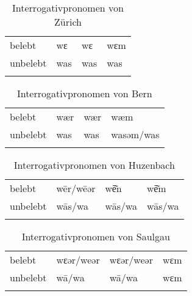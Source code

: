 
\begin{table}[H]
	\caption{Interrogativpronomen von Zürich \citep[144-145]{Weber1987}}\label{table70}
	\begin{tabular}{llll}
		\lsptoprule
		& \NOM & \AKK & \DAT\\\midrule
 belebt & wɛ & wɛ & wɛm\\
		unbelebt & was & was & was\\
		\lspbottomrule
	\end{tabular}
\end{table}


\begin{table}[H]
	\caption{Interrogativpronomen von Bern \citep[106]{Marti1985}}\label{table71}
	\begin{tabular}{llll}
		\lsptoprule
		& \NOM & \AKK & \DAT\\\midrule
 belebt & wær & wær & wæm\\
		unbelebt & was & was & wasəm/was\\
		\lspbottomrule
	\end{tabular}
\end{table}


\begin{table}[H]
	\caption{Interrogativpronomen von Huzenbach \citep[105]{Baur1967}}\label{table72}
	\begin{tabular}{llll}
		\lsptoprule
		& \NOM & \AKK & \DAT\\\midrule
 belebt & w\=er/w\=eǝr & w\=e͂n & w\=e͂m\\
		unbelebt & w\=as/wa & w\=as/wa & w\=as/wa\\
		\lspbottomrule
	\end{tabular}
\end{table}


\begin{table}[H]
	\caption{Interrogativpronomen von Saulgau \citep[120]{Raichle1932}}\label{table73}
	\begin{tabular}{llll}
		\lsptoprule
		& \NOM & \AKK & \DAT\\\midrule
 belebt & wɛǝr/weǝr & wɛǝr/weǝr & wɛm\\
		unbelebt & w\=a/wa & w\=a/wa & wɛm\\
		\lspbottomrule
	\end{tabular}
\end{table}

